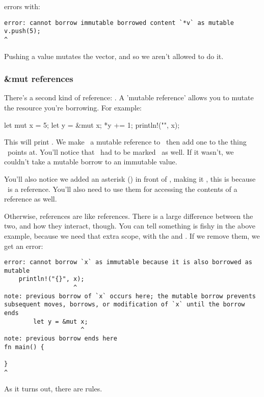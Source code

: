 errors with:

\begin{verbatim}
error: cannot borrow immutable borrowed content `*v` as mutable
v.push(5);
^
\end{verbatim}

Pushing a value mutates the vector, and so we aren't allowed to do it.

\subsubsection*{\&mut references}

There's a second kind of reference: . A 'mutable reference' allows you to mutate the resource you're borrowing. 
For example:

\begin{rustc}
let mut x = 5;
{
    let y = &mut x;
    *y += 1;
}
println!("{}", x);
\end{rustc}

This will print . We make \y\ a mutable reference to \x\, then add one to the thing \y\ points at. You'll 
notice that \x\ had to be marked \mut\ as well. If it wasn't, we couldn't take a mutable borrow to an immutable value.

\blank

You'll also notice we added an asterisk (\code{*}) in front of \y, making it , this is because \y\ is a 
 reference. You'll also need to use them for accessing the contents of a reference as well.

\blank

Otherwise,  references are like references. There is a large difference between the two, and how they interact, though. 
You can tell something is fishy in the above example, because we need that extra scope, with the \code{\{} and \code{\}}. If we 
remove them, we get an error:

\begin{verbatim}
error: cannot borrow `x` as immutable because it is also borrowed as mutable
    println!("{}", x);
                   ^
note: previous borrow of `x` occurs here; the mutable borrow prevents
subsequent moves, borrows, or modification of `x` until the borrow ends
        let y = &mut x;
                     ^
note: previous borrow ends here
fn main() {

}
^
\end{verbatim}

As it turns out, there are rules.

